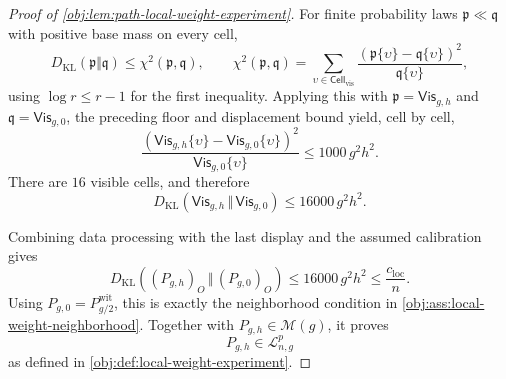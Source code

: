 \begin{proof}[Proof of \cref{obj:lem:path-local-weight-experiment}]
For finite probability laws \(\mathfrak p\ll\mathfrak q\) with positive base mass on every cell,
\[
D_{\mathrm{KL}}(\mathfrak p\Vert\mathfrak q)
\le
\chi^2(\mathfrak p,\mathfrak q),
\qquad
\chi^2(\mathfrak p,\mathfrak q)
=
\sum_{\upsilon\in\mathsf{Cell}_{\mathrm{vis}}}
\frac{(\mathfrak p\{\upsilon\}-\mathfrak q\{\upsilon\})^2}{\mathfrak q\{\upsilon\}},
\]
using \(\log r\le r-1\) for the first inequality.  Applying this with \(\mathfrak p=\mathsf{Vis}_{g,h}\) and \(\mathfrak q=\mathsf{Vis}_{g,0}\), the preceding floor and displacement bound yield, cell by cell,
\[
\frac{
\left(\mathsf{Vis}_{g,h}\{\upsilon\}-\mathsf{Vis}_{g,0}\{\upsilon\}\right)^2
}{
\mathsf{Vis}_{g,0}\{\upsilon\}
}
\le
1000\,g^2h^2 .
\]
There are \(16\) visible cells, and therefore
\[
D_{\mathrm{KL}}\!\left(\mathsf{Vis}_{g,h}\,\Vert\,\mathsf{Vis}_{g,0}\right)
\le
16000\,g^2h^2 .
\] %

Combining data processing with the last display and the assumed calibration gives
\[
D_{\mathrm{KL}}\!\left((P_{g,h})_O\,\Vert\,(P_{g,0})_O\right)
\le
16000\,g^2h^2
\le
\frac{c_{\mathrm{loc}}}{n}.
\]
Using \(P_{g,0}=P^{\mathrm{wit}}_{g/2}\), this is exactly the neighborhood condition in \cref{obj:ass:local-weight-neighborhood}.  Together with \(P_{g,h}\in\mathcal M(g)\), it proves
\[
P_{g,h}\in\mathcal L_{n,g}^p
\]
as defined in \cref{obj:def:local-weight-experiment}. %
\end{proof}
